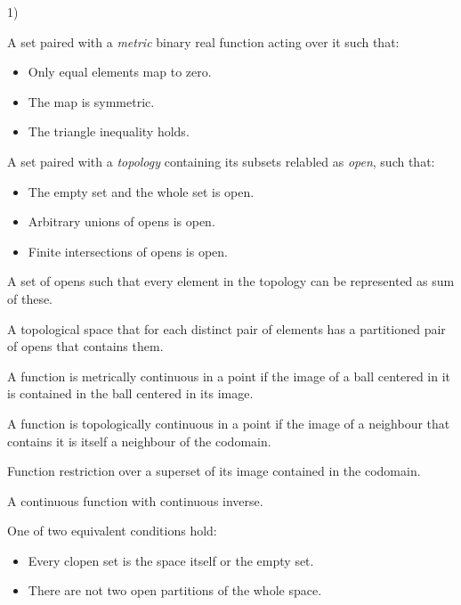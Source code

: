 \begin{multicols}{3}
  1)
\end{multicols}

\begin{multicols*}{3}
  A set paired with a \textit{metric} binary real function acting over it such that:
  \begin{itemize}
  \item Only equal elements map to zero.
  \item The map is symmetric.
  \item The triangle inequality holds.
  \end{itemize}

  A set paired with a \textit{topology} containing its subsets relabled as \textit{open}, such that:
  \begin{itemize}
  \item The empty set and the whole set is open.
  \item Arbitrary unions of opens is open.
  \item Finite intersections of opens is open.
  \end{itemize}

  A set of opens such that every element in the topology can be represented as sum of these.

  A topological space that for each distinct pair of elements has a partitioned pair of opens that contains them.

  A function is metrically continuous in a point if the image of a ball centered in it is contained in the ball centered in its image.

  A function is topologically continuous in a point if the image of a neighbour that contains it is itself a neighbour of the codomain.

  Function restriction over a superset of its image contained in the codomain.

  A continuous function with continuous inverse.
  
  One of two equivalent conditions hold:
  \begin{itemize}
  \item Every clopen set is the space itself or the empty set.
  \item There are not two open partitions of the whole space.
  \end{itemize}


\end{multicols*}
